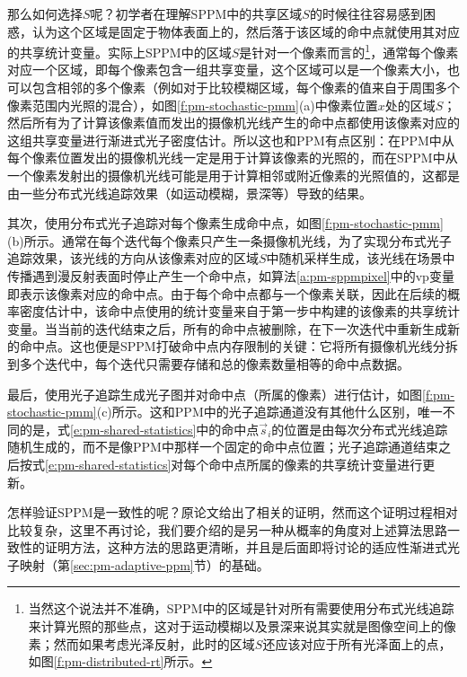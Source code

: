那么如何选择$S$呢？初学者在理解SPPM中的共享区域$S$的时候往往容易感到困惑，认为这个区域是固定于物体表面上的，然后落于该区域的命中点就使用其对应的共享统计变量。实际上SPPM中的区域$S$是针对一个像素而言的\footnote{当然这个说法并不准确，SPPM中的区域是针对所有需要使用分布式光线追踪来计算光照的那些点，这对于运动模糊以及景深来说其实就是图像空间上的像素；然而如果考虑光泽反射，此时的区域$S$还应该对应于所有光泽面上的点，如图\ref{f:pm-distributed-rt}所示。}，通常每个像素对应一个区域，即每个像素包含一组共享变量，这个区域可以是一个像素大小，也可以包含相邻的多个像素（例如对于比较模糊区域，每个像素的值来自于周围多个像素范围内光照的混合），如图\ref{f:pm-stochastic-pmm}(a)中像素位置$x$处的区域$S$；然后所有为了计算该像素值而发出的摄像机光线产生的命中点都使用该像素对应的这组共享变量进行渐进式光子密度估计。所以这也和PPM有点区别：在PPM中从每个像素位置发出的摄像机光线一定是用于计算该像素的光照的，而在SPPM中从一个像素发射出的摄像机光线可能是用于计算相邻或附近像素的光照值的，这都是由一些分布式光线追踪效果（如运动模糊，景深等）导致的结果。

其次，使用分布式光子追踪对每个像素生成命中点，如图\ref{f:pm-stochastic-pmm}(b)所示。通常在每个迭代每个像素只产生一条摄像机光线，为了实现分布式光子追踪效果，该光线的方向从该像素对应的区域$S$中随机采样生成，该光线在场景中传播遇到漫反射表面时停止产生一个命中点，如算法\ref{a:pm-sppmpixel}中的vp变量即表示该像素对应的命中点。由于每个命中点都与一个像素关联，因此在后续的概率密度估计中，该命中点使用的统计变量来自于第一步中构建的该像素的共享统计变量。当当前的迭代结束之后，所有的命中点被删除，在下一次迭代中重新生成新的命中点。这也便是SPPM打破命中点内存限制的关键：它将所有摄像机光线分拆到多个迭代中，每个迭代只需要存储和总的像素数量相等的命中点数据。

最后，使用光子追踪生成光子图并对命中点（所属的像素）进行估计，如图\ref{f:pm-stochastic-pmm}(c)所示。这和PPM中的光子追踪通道没有其他什么区别，唯一不同的是，式\ref{e:pm-shared-statistics}中的命中点$\vec{s}_i$的位置是由每次分布式光线追踪随机生成的，而不是像PPM中那样一个固定的命中点位置；光子追踪通道结束之后按式\ref{e:pm-shared-statistics}对每个命中点所属的像素的共享统计变量进行更新。

怎样验证SPPM是一致性的呢？原论文\cite{a:StochasticProgressivePhotonMapping}给出了相关的证明，然而这个证明过程相对比较复杂，这里不再讨论，我们要介绍的是另一种从概率的角度对上述算法思路一致性的证明方法，这种方法的思路更清晰，并且是后面即将讨论的适应性渐进式光子映射（第\ref{sec:pm-adaptive-ppm}节）的基础。





